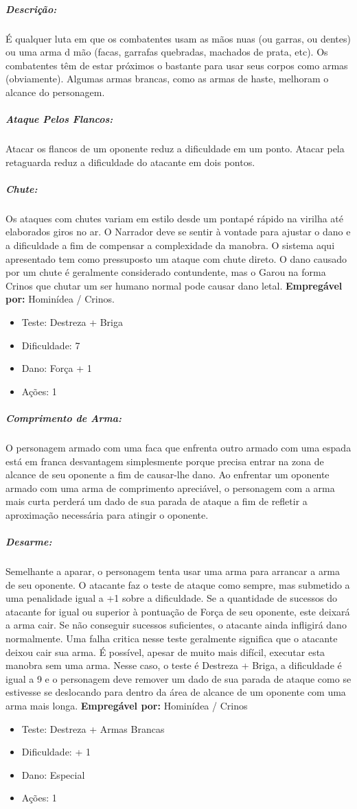 
\subparagraph*{\bf Descrição:} É qualquer luta em que os combatentes usam as mãos nuas (ou garras, ou dentes) ou uma arma d mão (facas, garrafas quebradas, machados de prata, etc). Os combatentes têm de estar próximos o bastante para usar seus corpos como armas (obviamente). Algumas armas brancas, como as armas de haste, melhoram o alcance do personagem.

\subparagraph{\bf Ataque Pelos Flancos:}
Atacar os flancos de um oponente reduz a dificuldade em um ponto. Atacar pela retaguarda reduz a dificuldade do atacante em dois pontos.

\subparagraph{\bf Chute:}
Os ataques com chutes variam em estilo desde um pontapé rápido na virilha até elaborados giros no ar. O Narrador deve se sentir à vontade para ajustar o dano e a dificuldade a fim de compensar a complexidade da manobra. O sistema aqui apresentado tem como pressuposto um ataque com chute direto.
O dano causado por um chute é geralmente considerado contundente, mas o Garou na forma Crinos que chutar um ser humano normal pode causar dano letal.
{\bf Empregável por:} Hominídea / Crinos.
\begin{itemize}[noitemsep]
\item Teste: Destreza + Briga
\item Dificuldade: 7
\item Dano: Força + 1
\item Ações: 1
\end{itemize}

\subparagraph{\bf Comprimento de Arma:}
O personagem armado com uma faca que enfrenta outro armado com uma espada está em franca desvantagem simplesmente porque precisa entrar na zona de alcance de seu oponente a fim de causar-lhe dano. Ao enfrentar um oponente armado com uma arma de comprimento apreciável, o personagem com a arma mais curta perderá um dado de sua parada de ataque a fim de refletir a aproximação necessária para atingir o oponente.

\subparagraph{\bf Desarme:}
Semelhante a aparar, o personagem tenta usar uma arma para arrancar a arma de seu oponente. O atacante faz o teste de ataque como sempre, mas submetido a uma penalidade igual a +1 sobre a dificuldade. Se a quantidade de sucessos do atacante for igual ou superior à pontuação de Força de seu oponente, este deixará a arma cair. Se não conseguir sucessos suficientes, o atacante ainda infligirá dano normalmente. Uma falha critica nesse teste geralmente significa que o atacante deixou cair sua arma.
É possível, apesar de muito mais difícil, executar esta manobra sem uma arma. Nesse caso, o teste é Destreza + Briga, a dificuldade é igual a 9 e o personagem deve remover um dado de sua parada de ataque como se estivesse se deslocando para dentro da área de alcance de um oponente com uma arma mais longa.
{\bf Empregável por:} Hominídea / Crinos
\begin{itemize}[noitemsep]
\item Teste: Destreza + Armas Brancas
\item Dificuldade: + 1
\item Dano: Especial
\item Ações: 1
\end{itemize}

